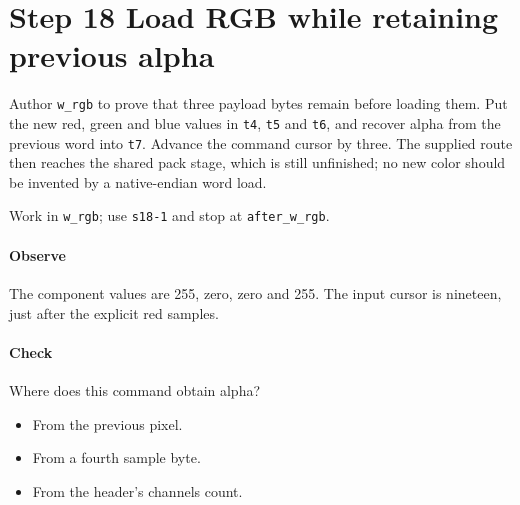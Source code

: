 \section{Step 18 Load RGB while retaining previous alpha}\label{qoi-s18}
Author \texttt{w\_rgb} to prove that three payload bytes remain before loading them. Put the new red, green and blue values in \texttt{t4}, \texttt{t5} and \texttt{t6}, and recover alpha from the previous word into \texttt{t7}. Advance the command cursor by three. The supplied route then reaches the shared pack stage, which is still unfinished; no new color should be invented by a native-endian word load.

Work in \texttt{w\_rgb}; use \texttt{s18-1} and stop at \texttt{after\_w\_rgb}.

\paragraph{Observe} The component values are 255, zero, zero and 255. The input cursor is nineteen, just after the explicit red samples.

\paragraph{Check} Where does this command obtain alpha?
\begin{itemize}
  \item[A.] From the previous pixel.
  \item[B.] From a fourth sample byte.
  \item[C.] From the header’s channels count.
\end{itemize}
